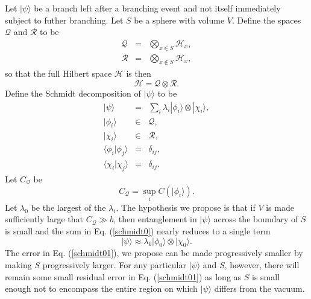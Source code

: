 \documentclass[twocolumn,amsmath,amssymb]{revtex4-1}
\begin{document}
Let $|\psi \rangle $ be a branch left after a branching event and not itself
immediately subject to futher branching. Let $S$ be
a sphere with volume $V$. Define the spaces $\mathcal{Q}$ and $\mathcal{R}$
to be
\begin{subequations}
  \begin{eqnarray}
    \label{defq3}
    \mathcal{Q} & = & \bigotimes_{x \in S} \mathcal{H}_x, \\
    \label{defr3}
    \mathcal{R} & = & \bigotimes_{x \notin S} \mathcal{H}_x,
  \end{eqnarray}
\end{subequations}
so that the full Hilbert space $\mathcal{H}$ is then
\begin{equation}
  \label{hyetagain}
  \mathcal{H} = \mathcal{Q} \otimes \mathcal{R}.
\end{equation}
Define the Schmidt decomposition of $|\psi \rangle $ to be
\begin{subequations}
  \begin{eqnarray}
    \label{schmidt0}
    |\psi \rangle  & = & \sum_i \lambda_i |\phi_i \rangle  \otimes |\chi_i \rangle , \\
    \label{schmidt1}
    |\phi_i \rangle  & \in & \mathcal{Q}, \\
    \label{schmidt2}
    |\chi_i \rangle  & \in & \mathcal{R}, \\
    \label{schmidt11}
     \langle  \phi_i | \phi_j \rangle  & = & \delta_{ij}, \\
     \label{schmidt21}
     \langle  \chi_i | \chi_j \rangle  & = & \delta_{ij}.
  \end{eqnarray}
\end{subequations}
Let $C_\mathcal{Q}$ be
\begin{equation}
  \label{defcv}
  C_\mathcal{Q} = \sup_i C( |\phi_i \rangle ).
\end{equation}
Let $\lambda_0$ be the largest of the $\lambda_i$.
The hypothesis we propose is that if $V$ is made sufficiently large
that $C_{\mathcal{Q}} \gg b$, then
entanglement in $|\psi \rangle $ across the boundary of $S$
is small and the sum in Eq. (\ref{schmidt0}) nearly reduces to a single term 
\begin{equation}
    \label{schmidt01}
    |\psi \rangle   \approx  \lambda_0 |\phi_0 \rangle  \otimes |\chi_0 \rangle .
\end{equation}
The error in Eq. (\ref{schmidt01}), 
we propose can be made progressively smaller
by making $S$ progressively larger.
For any particular $|\psi \rangle $ and $S$, however, there will
remain some small residual error in Eq. (\ref{schmidt01})
as long as $S$ is small enough not to encompass the
entire region on which $|\psi \rangle $ differs
from the vacuum.
\end{document}
